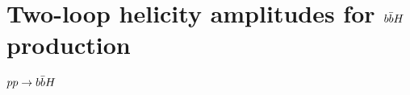 \documentclass[main.tex]{subfiles}
\begin{document}
\chapter{Two-loop helicity amplitudes for $b\bar{b}H$ production}
$pp \rightarrow b\bar{b}H$
\end{document}
